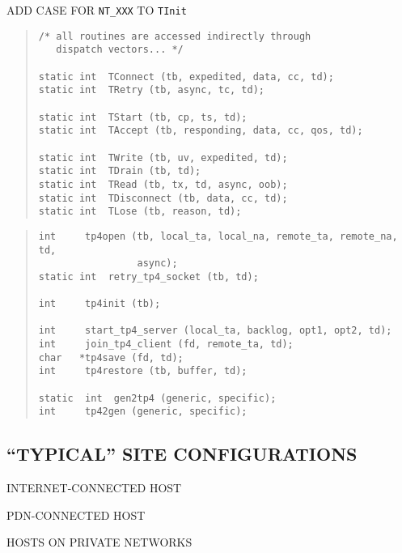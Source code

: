 \begin{bwslide}

\begin{nrtc}
\item	ADD CASE FOR \verb"NT_XXX" TO \verb"TInit"
\end{nrtc}
\end{bwslide}


\begin{bwslide}

\begin{quote}\small\begin{verbatim}
/* all routines are accessed indirectly through 
   dispatch vectors... */

static int  TConnect (tb, expedited, data, cc, td);
static int  TRetry (tb, async, tc, td);

static int  TStart (tb, cp, ts, td);
static int  TAccept (tb, responding, data, cc, qos, td);

static int  TWrite (tb, uv, expedited, td);
static int  TDrain (tb, td);
static int  TRead (tb, tx, td, async, oob);
static int  TDisconnect (tb, data, cc, td);
static int  TLose (tb, reason, td);
\end{verbatim}\end{quote}
\end{bwslide}


\begin{bwslide}

\begin{quote}\small\begin{verbatim}
int     tp4open (tb, local_ta, local_na, remote_ta, remote_na, td,
                 async);
static int  retry_tp4_socket (tb, td);

int     tp4init (tb);

int     start_tp4_server (local_ta, backlog, opt1, opt2, td);
int     join_tp4_client (fd, remote_ta, td);
char   *tp4save (fd, td);
int     tp4restore (tb, buffer, td);

static  int  gen2tp4 (generic, specific);
int     tp42gen (generic, specific);
\end{verbatim}\end{quote}
\end{bwslide}


\begin{bwslide}
\part	{``TYPICAL'' SITE CONFIGURATIONS}\bf

\begin{nrtc}
\item	INTERNET-CONNECTED HOST

\item	PDN-CONNECTED HOST

\item	HOSTS ON PRIVATE NETWORKS
\end{nrtc}
\end{bwslide}


